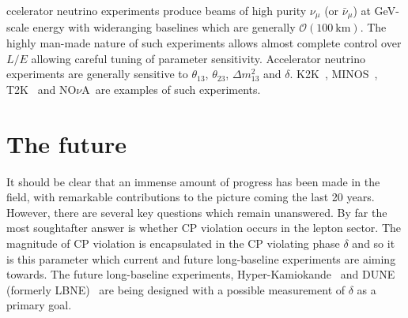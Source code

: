 ccelerator neutrino experiments produce beams of high purity $\nu_\mu$ (or $\bar{\nu}_\mu$) at GeV-scale energy with wideranging baselines which are generally $\mathcal{O}\left(100~\textrm{km}\right)$.  The highly man-made nature of such experiments allows almost complete control over $L/E$ allowing careful tuning of parameter sensitivity.  Accelerator neutrino experiments are generally sensitive to $\theta_{13}$, $\theta_{23}$, $\Delta m^{2}_{13}$ and $\delta$. K2K~\cite{PhysRevD.74.072003}, MINOS~\cite{PhysRevLett.97.191801}, T2K~\cite{PhysRevLett.112.061802} and NO$\nu$A~\cite{Ayres:2004js}are examples of such experiments.

\section{The future}
\label{sec:NeutrinoFieldFuture}
It should be clear that an immense amount of progress has been made in the field, with remarkable contributions to the picture coming  the last 20 years.  However, there are several key questions which remain unanswered.  
\newline
\newline
By far the most soughtafter answer is whether CP violation occurs in the lepton sector.  The magnitude of CP violation is encapsulated in the CP violating phase $\delta$ and so it is this parameter which current and future long-baseline experiments are aiming towards.   The future long-baseline experiments, Hyper-Kamiokande~\cite{Abe:2014oxa} and DUNE (formerly LBNE)~\cite{Adams:2013qkq} are being designed with a possible measurement of $\delta$ as a primary goal.
\newline
\newline
